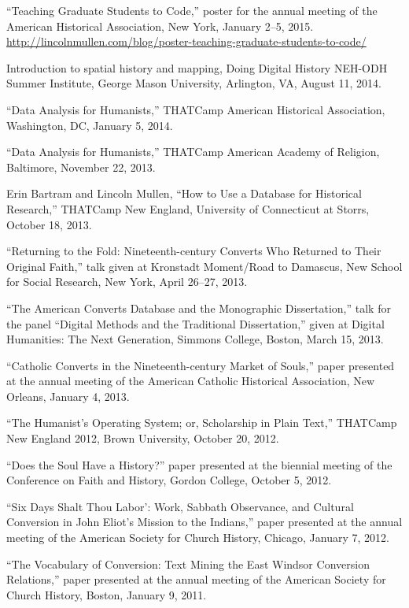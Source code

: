 \documentclass[11pt]{article}
\begin{document}
``Teaching Graduate Students to Code,'' poster for the annual meeting of the
American Historical Association, New York, January 2--5, 2015.
\url{http://lincolnmullen.com/blog/poster-teaching-graduate-students-to-code/}

Introduction to spatial history and mapping, Doing Digital History NEH-ODH 
Summer Institute, George Mason University, Arlington, VA, August 11, 2014.

``Data Analysis for Humanists,'' THATCamp American Historical Association, 
Washington, DC, January 5, 2014.

``Data Analysis for Humanists,'' THATCamp American Academy of Religion, 
Baltimore, November 22, 2013.

Erin Bartram and Lincoln Mullen, ``How to Use a Database for Historical 
Research,'' THATCamp New England, University of Connecticut at Storrs, October 
18, 2013.

``Returning to the Fold: Nineteenth-century Converts Who Returned to
Their Original Faith,'' talk given at Kronstadt Moment/Road to Damascus,
New School for Social Research, New York, April 26--27, 2013.

``The American Converts Database and the Monographic Dissertation,''
talk for the panel ``Digital Methods and the Traditional Dissertation,''
given at Digital Humanities: The Next Generation, Simmons College,
Boston, March 15, 2013.

``Catholic Converts in the Nineteenth-century Market of Souls,'' paper
presented at the annual meeting of the American Catholic Historical
Association, New Orleans, January 4, 2013.

``The Humanist's Operating System; or, Scholarship in Plain Text,'' THATCamp 
New England 2012, Brown University, October 20, 2012.

``Does the Soul Have a History?'' paper presented at the biennial
meeting of the Conference on Faith and History, Gordon College, October
5, 2012.

``Six Days Shalt Thou Labor': Work, Sabbath Observance, and Cultural
Conversion in John Eliot's Mission to the Indians,'' paper presented at
the annual meeting of the American Society for Church History, Chicago,
January 7, 2012.

``The Vocabulary of Conversion: Text Mining the East Windsor Conversion
Relations,'' paper presented at the annual meeting of the American
Society for Church History, Boston, January 9, 2011.

\end{document}
